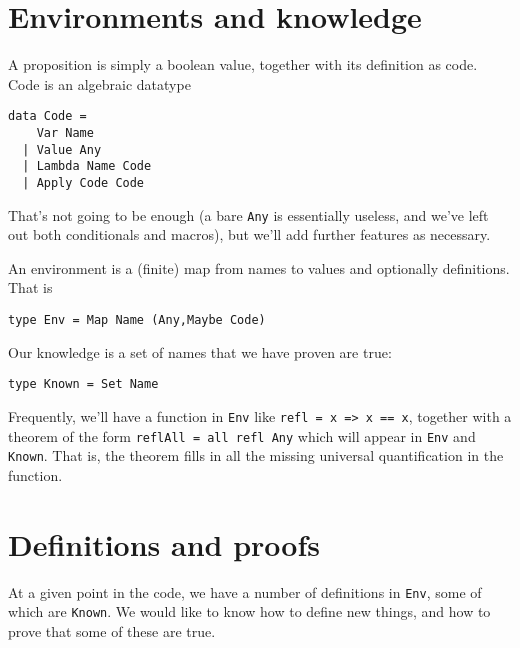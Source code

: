 \documentclass[11pt]{article}
\newcommand{\cc}[1]{\texttt{#1}}
\newcommand{\Env}{\cc{Env}}
\newcommand{\Known}{\cc{Known}}
\begin{document}
\section{Environments and knowledge}

A proposition is simply a boolean value, together with its definition as code.  Code is an
algebraic datatype
\begin{verbatim}
data Code =
    Var Name
  | Value Any
  | Lambda Name Code
  | Apply Code Code
\end{verbatim}
That's not going to be enough (a bare \cc{Any} is essentially useless, and we've left out
both conditionals and macros), but we'll add further features as necessary.

An environment is a (finite) map from names to values and optionally definitions.  That is
\begin{verbatim}
type Env = Map Name (Any,Maybe Code)
\end{verbatim}
Our knowledge is a set of names that we have proven are true:
\begin{verbatim}
type Known = Set Name
\end{verbatim}

Frequently, we'll have a function in \cc{Env} like \cc{refl = x => x == x}, together with a theorem
of the form \cc{reflAll = all refl Any} which will appear in \cc{Env} and \cc{Known}.  That is, the
theorem fills in all the missing universal quantification in the function.

\section{Definitions and proofs}

At a given point in the code, we have a number of definitions in \Env, some of which are \Known.
We would like to know how to define new things, and how to prove that some of these are true.
\end{document}
